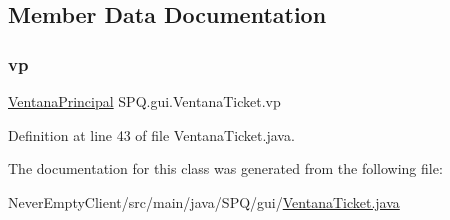 \subsection{Member Data Documentation}
\mbox{\label{class_s_p_q_1_1gui_1_1_ventana_ticket_a0aef577c7b99bffe0ff8a050c7cc63c0}} 
\subsubsection{\texorpdfstring{vp}{vp}}
{\footnotesize\ttfamily \mbox{\hyperlink{class_s_p_q_1_1gui_1_1_ventana_principal}{Ventana\+Principal}} S\+P\+Q.\+gui.\+Ventana\+Ticket.\+vp}



Definition at line 43 of file Ventana\+Ticket.\+java.



The documentation for this class was generated from the following file\+:\begin{DoxyCompactItemize}
\item 
Never\+Empty\+Client/src/main/java/\+S\+P\+Q/gui/\mbox{\hyperlink{_ventana_ticket_8java}{Ventana\+Ticket.\+java}}\end{DoxyCompactItemize}
